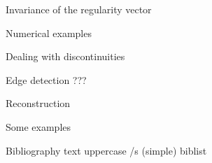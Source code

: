 \sec Invariance of the regularity vector


\sec Numerical examples


\chap Dealing with discontinuities

\sec Edge detection ???

\sec Reconstruction

\sec Some examples












\def\_mtext#1{BIBLIOGRAPHY}
\let\uppercase\ignoreit
\nonum\chap Bibliography
\let\_mtext\omtext
\let\uppercase\_uppercase
\def\_opwarning#1{}
\usebib/s (simple) biblist


\bye
